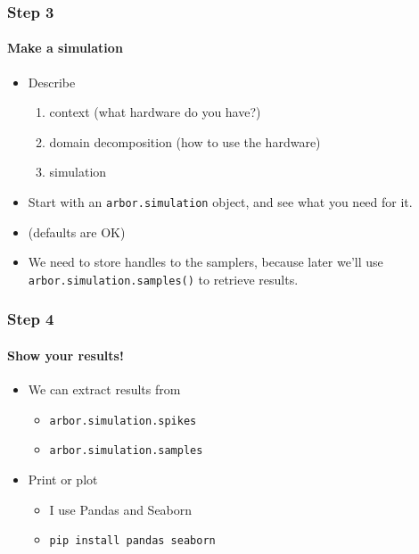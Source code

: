 \documentclass[t]{beamer}
\begin{document}
\begin{frame}
    \frametitle{Step 3}
    \framesubtitle{Make a simulation}
    \begin{itemize}
        \item Describe
        \begin{enumerate}
            \item context (what hardware do you have?)
            \item domain decomposition (how to use the hardware)
            \item simulation
        \end{enumerate}
        \item Start with an \texttt{arbor.simulation} object, and see what you need for it.
        \item (defaults are OK)
        \item We need to store handles to the samplers, because later we’ll use \texttt{arbor.simulation.samples()} to retrieve results.
    \end{itemize}
\end{frame}


\begin{frame}
    \frametitle{Step 4}
    \framesubtitle{Show your results!}
    \begin{itemize}
        \item We can extract results from
        \begin{itemize}
            \item \texttt{arbor.simulation.spikes}
            \item \texttt{arbor.simulation.samples}
        \end{itemize}
        \item Print or plot
        \begin{itemize}
            \item I use Pandas and Seaborn
            \item \texttt{pip install pandas seaborn}
        \end{itemize}
    \end{itemize}
\end{frame}
\end{document}
